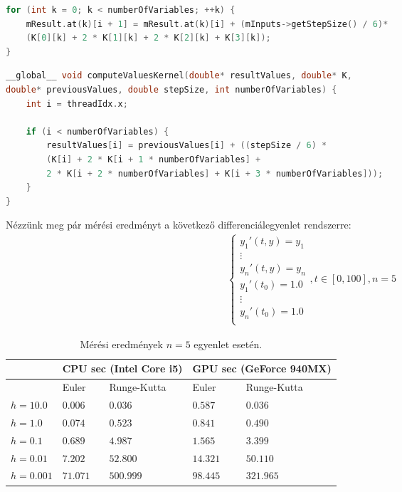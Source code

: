 \begin{lstlisting}[caption={Runge-Kutta módszer szekvenciális kód.}, captionpos=b, language = C++]
for (int k = 0; k < numberOfVariables; ++k) {
	mResult.at(k)[i + 1] = mResult.at(k)[i] + (mInputs->getStepSize() / 6)*
	(K[0][k] + 2 * K[1][k] + 2 * K[2][k] + K[3][k]);
}
\end{lstlisting}

\begin{lstlisting}[caption={Runge-Kutta módszer párhuzamosított kód.}, captionpos=b, language = C++]
__global__ void computeValuesKernel(double* resultValues, double* K,
double* previousValues, double stepSize, int numberOfVariables) {
	int i = threadIdx.x;
	
	if (i < numberOfVariables) {
		resultValues[i] = previousValues[i] + ((stepSize / 6) *
		(K[i] + 2 * K[i + 1 * numberOfVariables] +
		2 * K[i + 2 * numberOfVariables] + K[i + 3 * numberOfVariables]));
	}
}
\end{lstlisting}

Nézzünk meg pár mérési eredményt a következő differenciálegyenlet rendszerre:
\begin{align}
	\begin{cases}
		y_{1}'(t, y) = y_{1} \\
		\vdots \\
		y_{n}'(t, y) = y_{n}\\
		y_{1}'(t_{0}) = 1.0 \\
		\vdots \\
		y_{n}'(t_{0}) = 1.0\\
	\end{cases}
	, t\in[0, 100], n = 5
\end{align}

\begin{table}[h!]
	\centering
	\begin{tabular}{ | p{1.8cm} | p{2.5cm} | p{2.5cm} | p{2.5cm} | p{2.5cm} |}
		\hline  & \multicolumn{2}{|c|}{\textbf{CPU sec (Intel Core i5)}} & \multicolumn{2}{|c|}{\textbf{GPU sec (GeForce 940MX)}}\\ 
		\hline  & Euler & Runge-Kutta & Euler & Runge-Kutta\\ 
		\hline
		$ h = 10.0 $ & $ 0.006 $ & $ 0.036 $ & $ 0.587 $ & $ 0.036 $ \\ 
		\hline
		$ h = 1.0 $ & $ 0.074 $ & $ 0.523 $ & $ 0.841 $ & $ 0.490 $ \\
		\hline
		$ h = 0.1 $ & $ 0.689 $ & $ 4.987 $ & $ 1.565 $ & $ 3.399 $ \\
		\hline
		$ h = 0.01 $ & $ 7.202 $ & $ 52.800 $ & $ 14.321 $ & $ 50.110 $ \\
		\hline
		$ h = 0.001 $ & $ 71.071 $ & $ 500.999 $ & $ 98.445 $ & $ 321.965 $ \\
		\hline
	\end{tabular}
	\caption{Mérési eredmények $ n = 5 $ egyenlet esetén.}
\end{table}

